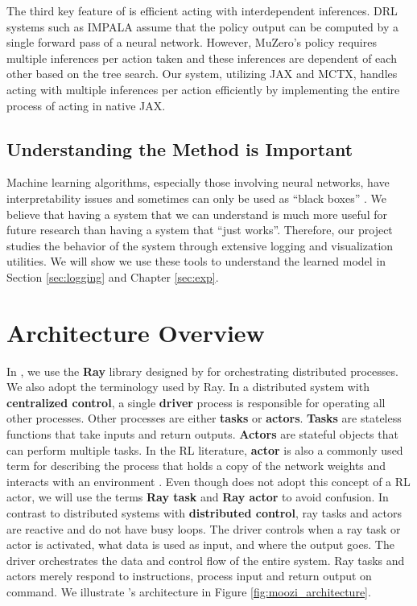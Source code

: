 The third key feature of \moozi is efficient acting with interdependent inferences.
DRL systems such as IMPALA assume that the policy output can be computed by a single forward pass of a neural network.
However, MuZero's policy requires multiple inferences per action taken and these inferences are dependent of each other based on the tree search.
Our system, utilizing JAX and MCTX, handles acting with multiple inferences per action efficiently by implementing the entire process of acting in native JAX.

\subsection{Understanding the Method is Important}
Machine learning algorithms, especially those involving neural networks, have interpretability issues and sometimes can only be used as ``black boxes'' \cite{ExplainableAIReview_Linardatos.Papastefanopoulos.ea_2021}.
We believe that having a system that we can understand is much more useful for future research than having a system that ``just works''.
Therefore, our project studies the behavior of the system through extensive logging and visualization utilities.
We will show we use these tools to understand the learned model in Section \ref{sec:logging} and Chapter \ref{sec:exp}.

\section{Architecture Overview}
In \moozi, we use the \textbf{Ray} library designed by \citeauthor{RayDistributedFramework_Moritz.Nishihara.ea_2018} \cite{RayDistributedFramework_Moritz.Nishihara.ea_2018} for orchestrating distributed processes.
We also adopt the terminology used by Ray.
In a distributed system with \textbf{centralized control}, a single \textbf{driver} process is responsible for operating all other processes.
Other processes are either \textbf{tasks} or \textbf{actors}.
\textbf{Tasks} are stateless functions that take inputs and return outputs.
\textbf{Actors} are stateful objects that can perform multiple tasks.
In the RL literature, \textbf{actor} is also a commonly used term for describing the process that holds a copy of the network weights and interacts with an environment \cite{SEEDRLScalable_Espeholt.Marinier.ea_2020, IMPALAScalableDistributed_Espeholt.Soyer.ea_2018}.
Even though \moozi does not adopt this concept of a RL actor, we will use the terms \textbf{Ray task} and \textbf{Ray actor} to avoid confusion.
In contrast to distributed systems with \textbf{distributed control}, ray tasks and actors are reactive and do not have busy loops.
The driver controls when a ray task or actor is activated, what data is used as input, and where the output goes.
The driver orchestrates the data and control flow of the entire system.
Ray tasks and actors merely respond to instructions, process input and return output on command.
We illustrate \moozi's architecture in Figure \ref{fig:moozi_architecture}.


